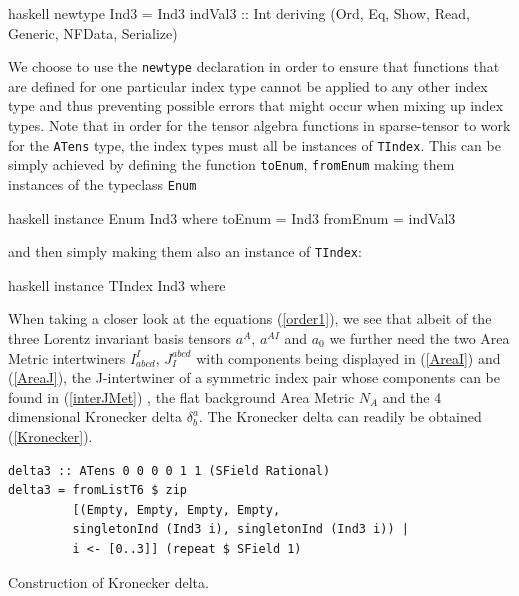 \documentclass[a4paper,12pt, DIV=14, BCOR=5mm, twoside, headsepline, numbers=noenddot]{scrbook}
\begin{document}
\begin{center}
\begin{cminted}{haskell}
newtype Ind3 =  Ind3 {indVal3 :: Int}
    deriving (Ord, Eq, Show, Read, Generic, NFData, Serialize)
\end{cminted}
\end{center}

We choose to use the \texttt{newtype} declaration in order to ensure that functions that are defined for one particular index type cannot be applied to any other index type and thus preventing possible errors that might occur when mixing up index types.
Note that in order for the tensor algebra functions in sparse-tensor to work for the \texttt{ATens} type, the index types must all be instances of \texttt{TIndex}. This can be simply achieved by defining the function \texttt{toEnum}, \texttt{fromEnum} making them instances of the typeclass \texttt{Enum} 

\begin{center}
\begin{cminted}{haskell}
instance Enum Ind3 where
    toEnum = Ind3
    fromEnum = indVal3
\end{cminted} 
\end{center}

and then simply making them also an instance of \texttt{TIndex}:

\begin{center}
\begin{cminted}{haskell}
instance TIndex Ind3 where
\end{cminted} 
\end{center}

When taking a closer look at the equations (\ref{order1}), we see that albeit of the three Lorentz invariant basis tensors $a^{A}$, $a^{AI}$ and $a_0$ we further need the two Area Metric intertwiners $I^I_{abcd}$, $J_I^{abcd}$ with components being displayed in (\ref{AreaI}) and (\ref{AreaJ}), the J-intertwiner of a symmetric index pair whose components can be found in (\ref{interJMet})  , the flat background Area Metric $N_A$ and the 4 dimensional Kronecker delta $\delta^a_b$. 
The Kronecker delta can readily be obtained (\ref{Kronecker}).

\begin{listing}[hbt!]
\begin{verbatim}
delta3 :: ATens 0 0 0 0 1 1 (SField Rational)
delta3 = fromListT6 $ zip
         [(Empty, Empty, Empty, Empty,
         singletonInd (Ind3 i), singletonInd (Ind3 i)) | 
         i <- [0..3]] (repeat $ SField 1)
\end{verbatim} 
\caption{Construction of Kronecker delta.}\label{Kronecker}
\end{listing}
\end{document}
